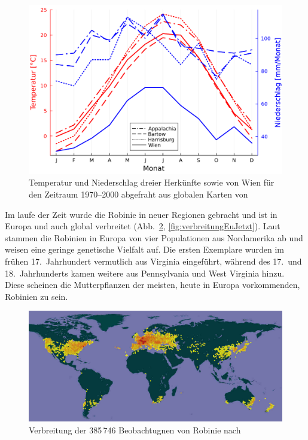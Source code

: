 \documentclass[twocolumn]{scrartcl}
\begin{document}
\begin{figure}[htbp]
  \centering
  \includegraphics[width=.9\linewidth]{./bild/wetter}
  \caption{Temperatur und Niederschlag dreier Herkünfte sowie von Wien für den
  Zeitraum 1970--2000 abgefraht aus globalen Karten von \cite{worldclim2017}}
  \label{fig:wetter}
\end{figure}

Im laufe der Zeit wurde die Robinie in neuer Regionen gebracht und ist in Europa
und auch global verbreitet (Abb.~\ref{fig:verbreitungGlob},
\ref{fig:verbreitungEuJetzt}). Laut \cite{bouteiller2019robinie} stammen die
Robinien in Europa von vier Populationen aus Nordamerika ab und weisen eine
geringe genetische Vielfalt auf. Die ersten Exemplare wurden im frühen 17.\
Jahrhundert vermutlich aus Virginia eingeführt, während des 17.\ und 18.\
Jahrhunderts kamen weitere aus Pennsylvania und West Virginia hinzu. Diese
scheinen die Mutterpflanzen der meisten, heute in Europa vorkommenden, Robinien
zu sein.

\begin{figure}[htbp]
  \centering
  \includegraphics[width=.9\linewidth]{./bild/verbreitungRobGlob}
  \caption{Verbreitung der 385\,746 Beobachtugnen von Robinie nach \cite{gbifRob}}
  \label{fig:verbreitungGlob}
\end{figure}
\end{document}
